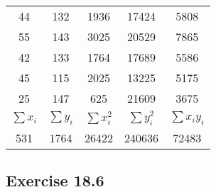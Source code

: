 \documentclass{report}
\begin{document}
\begin{multicols}{2}
\begin{enumerate}
\begin{enumerate}
\begin{center}
{\begin{tabular}{|c|c|c|c|c|}
                        44          & 132         & 1936          & 17424         & 5808           \\
                        55          & 143         & 3025          & 20529         & 7865           \\
                        42          & 133         & 1764          & 17689         & 5586           \\
                        45          & 115         & 2025          & 13225         & 5175           \\
                        25          & 147         & 625           & 21609         & 3675           \\
                        \hline
                        \hline
                        $\sum{x_i}$ & $\sum{y_i}$ & $\sum{x_i^2}$ & $\sum{y_i^2}$ & $\sum{x_iy_i}$ \\
                        \hline
                        531         & 1764        & 26422         & 240636        & 72483          \\
                        \hline

                      \end{tabular}
                    }
                  \end{center}
          \end{enumerate}
  \end{enumerate}

  \subsection{Exercise 18.6}


\end{multicols}
\end{document}
